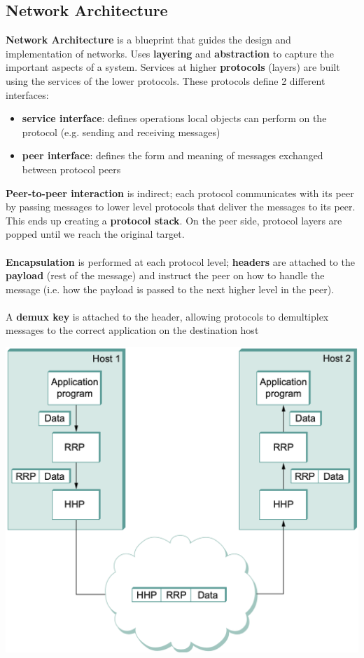 \documentclass{article}
\begin{document}
  \subsection{Network Architecture}
  \textbf{Network Architecture} is a blueprint that guides the design and implementation of networks. Uses \textbf{layering} and \textbf{abstraction} to capture the important aspects of a system. Services at higher \textbf{protocols} (layers) are built using the services of the lower protocols. These protocols define 2 different interfaces:
  \begin{itemize}
    \item \textbf{service interface}: defines operations local objects can perform on the protocol (e.g. sending and receiving messages)
    \item \textbf{peer interface}: defines the form and meaning of messages exchanged between protocol peers
  \end{itemize}
  \textbf{Peer-to-peer interaction} is indirect; each protocol communicates with its peer by passing messages to lower level protocols that deliver the messages to its peer. This ends up creating a \textbf{protocol stack}. On the peer side, protocol layers are popped until we reach the original target. \\ \\
  \textbf{Encapsulation} is performed at each protocol level; \textbf{headers} are attached to the \textbf{payload} (rest of the message) and instruct the peer on how to handle the message (i.e. how the payload is passed to the next higher level in the peer). \\ \\
  A \textbf{demux key} is attached to the header, allowing protocols to demultiplex messages to the correct application on the destination host
  \begin{center}
    \includegraphics[scale=0.3]{Encapsulation.png}
  \end{center}
\end{document}
